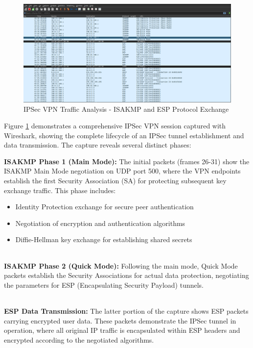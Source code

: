 \begin{figure}[H]
\centering
\includegraphics[width=\textwidth]{../resources/Images/IPsec_Packets.png}
\caption{IPSec VPN Traffic Analysis - ISAKMP and ESP Protocol Exchange}
\label{fig:ipsec_packets}
\end{figure}

Figure \ref{fig:ipsec_packets} demonstrates a comprehensive IPSec VPN session captured with Wireshark, showing the complete lifecycle of an IPSec tunnel establishment and data transmission. The capture reveals several distinct phases:

\noindent

\textbf{ISAKMP Phase 1 (Main Mode):} The initial packets (frames 26-31) show the ISAKMP Main Mode negotiation on UDP port 500, where the VPN endpoints establish the first Security Association (SA) for protecting subsequent key exchange traffic. This phase includes:
\begin{itemize}
    \item Identity Protection exchange for secure peer authentication
    \item Negotiation of encryption and authentication algorithms
    \item Diffie-Hellman key exchange for establishing shared secrets
\end{itemize}

\noindent
\\
\textbf{ISAKMP Phase 2 (Quick Mode):} Following the main mode, Quick Mode packets establish the Security Associations for actual data protection, negotiating the parameters for ESP (Encapsulating Security Payload) tunnels.

\noindent
\\
\textbf{ESP Data Transmission:} The latter portion of the capture shows ESP packets carrying encrypted user data. These packets demonstrate the IPSec tunnel in operation, where all original IP traffic is encapsulated within ESP headers and encrypted according to the negotiated algorithms.

